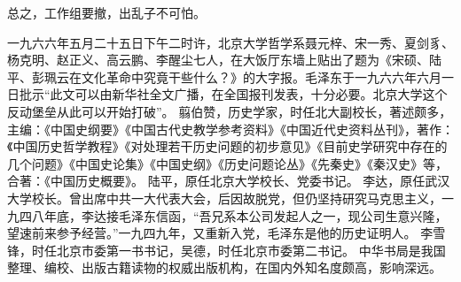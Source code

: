 总之，工作组要撤，出乱子不可怕。

\begin{maonote}
一九六六年五月二十五日下午二时许，北京大学哲学系聂元梓、宋一秀、夏剑豸、杨克明、赵正义、高云鹏、李醒尘七人，在大饭厅东墙上贴出了题为《宋硕、陆平、彭珮云在文化革命中究竟干些什么？》的大字报。毛泽东于一九六六年六月一日批示“此文可以由新华社全文广播，在全国报刊发表，十分必要。北京大学这个反动堡垒从此可以开始打破”。
翦伯赞，历史学家，时任北大副校长，著述颇多，主编：《中国史纲要》《中国古代史教学参考资料》《中国近代史资料丛刊》，著作：《中国历史哲学教程》《对处理若干历史问题的初步意见》《目前史学研究中存在的几个问题》《中国史论集》《中国史纲》《历史问题论丛》《先秦史》《秦汉史》等，合著：《中国历史概要》。
陆平，原任北京大学校长、党委书记。
李达，原任武汉大学校长。曾出席中共一大代表大会，后因故脱党，但仍坚持研究马克思主义，一九四八年底，李达接毛泽东信函，“吾兄系本公司发起人之一，现公司生意兴隆，望速前来参予经营。”一九四九年，又重新入党，毛泽东是他的历史证明人。
李雪锋，时任北京市委第一书书记，吴德，时任北京市委第二书记。
中华书局是我国整理、编校、出版古籍读物的权威出版机构，在国内外知名度颇高，影响深远。
\end{maonote}
